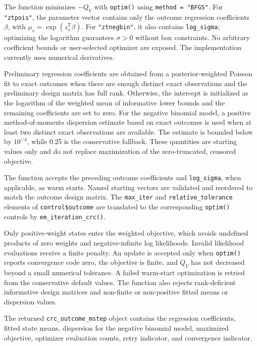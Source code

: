\documentclass[11pt,letterpaper]{article}
\begin{document}
The function minimizes $-Q_V$ with \texttt{optim()} using
\texttt{method = "BFGS"}. For \texttt{"ztpois"}, the parameter vector
contains only the outcome regression coefficients $\beta$, with
$\mu_s=\exp(z_s^\mathsf{T}\beta)$. For \texttt{"ztnegbin"}, it also contains
\texttt{log\_sigma}; optimizing the logarithm guarantees
$\sigma>0$ without box constraints. No arbitrary coefficient bounds or
user-selected optimizer are exposed. The implementation currently uses
numerical derivatives.

Preliminary regression coefficients are obtained from a posterior-weighted
Poisson fit to exact outcomes when there are enough distinct exact
observations and the preliminary design matrix has full rank. Otherwise, the
intercept is initialized as the logarithm of the weighted mean of informative
lower bounds and the remaining coefficients are set to zero. For the negative
binomial model, a positive method-of-moments dispersion estimate based on
exact outcomes is used when at least two distinct exact observations are
available. The estimate is bounded below by $10^{-4}$, while 0.25 is the
conservative fallback. These quantities are starting values only and do not
replace maximization of the zero-truncated, censored objective.

The function accepts the preceding outcome coefficients and
\texttt{log\_sigma}, when applicable, as warm starts. Named starting vectors
are validated and reordered to match the outcome design matrix. The
\texttt{max\_iter} and \texttt{relative\_tolerance} elements of
\texttt{control\$outcome} are translated to the corresponding
\texttt{optim()} controls by \texttt{em\_iteration\_crc()}.

Only positive-weight states enter the weighted objective, which avoids
undefined products of zero weights and negative-infinite log likelihoods.
Invalid likelihood evaluations receive a finite penalty. An update is
accepted only when \texttt{optim()} reports convergence code zero, the
objective is finite, and $Q_V$ has not decreased beyond a small numerical
tolerance. A failed warm-start optimization is retried from the conservative
default values. The function also rejects rank-deficient informative design
matrices and non-finite or non-positive fitted means or dispersion values.

The returned \texttt{crc\_outcome\_mstep} object contains the regression
coefficients, fitted state means, dispersion for the negative binomial model,
maximized objective, optimizer evaluation counts, retry indicator, and
convergence indicator.
\end{document}
